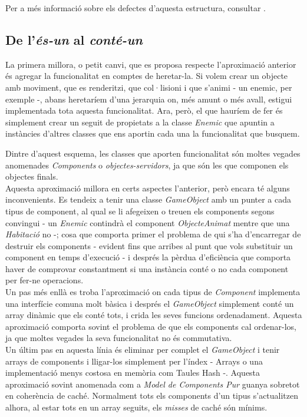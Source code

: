 \begin{description}
\end{description}

Per a més informació sobre els defectes d'aquesta estructura, consultar \cite{Wilson02}.

\subsection{De l'{\em és-un} al {\em conté-un}}

La primera millora, o petit canvi, que es proposa respecte l'aproximació anterior és agregar la funcionalitat en comptes de heretar-la. Si volem crear un objecte amb moviment, que es renderitzi, que col·lisioni i que s'animi - un enemic, per exemple -, abans heretaríem d'una jerarquia on, més amunt o més avall, estigui implementada tota aquesta funcionalitat. Ara, però, el que hauríem de fer és simplement crear un seguit de propietats a la classe {\em Enemic} que apuntin a instàncies d'altres classes que ens aportin cada una la funcionalitat que busquem.

Dintre d'aquest esquema, les classes que aporten funcionalitat són moltes vegades anomenades {\em Components} o {\em objectes-servidors}, ja que són les que componen els objectes finals.
\\

Aquesta aproximació millora en certs aspectes l'anterior, però encara té alguns inconvenients. Es tendeix a tenir una classe {\em GameObject} amb un punter a cada tipus de component, al qual se li afegeixen o treuen els components segons convingui - un {\em Enemic} contindrà el component {\em ObjecteAnimat} mentre que una {\em Habitació} no -; cosa que comporta primer el problema de qui s'ha d'encarregar de destruir els components - evident fins que arribes al punt que vols substituir un component en temps d'execució - i després la pèrdua d'eficiència que comporta haver de comprovar constantment si una instància conté o no cada component per fer-ne operacions.
\\

Un pas més enllà es troba l'aproximació on cada tipus de {\em Component} implementa una interfície comuna molt bàsica i després el {\em GameObject} simplement conté un array dinàmic que els conté tots, i crida les seves funcions ordenadament. Aquesta aproximació comporta sovint el problema de que els components cal ordenar-los, ja que moltes vegades la seva funcionalitat no és commutativa.
\\

Un últim pas en aquesta línia és eliminar per complet el {\em GameObject} i tenir arrays de components i lligar-los simplement per l'índex - Arrays o una implementació menys costosa en memòria com Taules Hash -. Aquesta aproximació sovint anomenada com a {\em Model de Components Pur} guanya sobretot en coherència de caché. Normalment tots els components d'un tipus s'actualitzen alhora, al estar tots en un array seguits, els {\em misses} de caché són mínims.
\\

